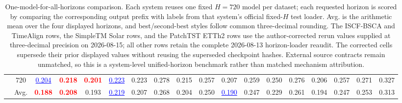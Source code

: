 \begin{table}[t]
{\begin{tabular}{cc|cc|cc|cc|cc|cc|cc|cc|cc}
 & 720 & \textcolor{blue}{\underline{0.204}} & \textcolor{red}{\textbf{0.218}} & \textcolor{red}{\textbf{0.201}} & \textcolor{blue}{\underline{0.223}} & 0.223 & 0.278 & 0.215 & 0.257 & 0.207 & 0.259 & 0.250 & 0.276 & 0.206 & 0.257 & 0.271 & 0.327 \\
\cmidrule(lr){2-18}
 & Avg. & \textcolor{red}{\textbf{0.188}} & \textcolor{red}{\textbf{0.208}} & 0.193 & \textcolor{blue}{\underline{0.219}} & 0.207 & 0.268 & 0.204 & 0.250 & \textcolor{blue}{\underline{0.190}} & 0.247 & 0.229 & 0.261 & 0.194 & 0.247 & 0.253 & 0.313 \\
\bottomrule
\end{tabular}%
}
\caption{One-model-for-all-horizons comparison. Each system reuses one fixed $H=720$ model per dataset; each requested horizon is scored by comparing the corresponding output prefix with labels from that system's official fixed-$H$ test loader. Avg. is the arithmetic mean over the four displayed horizons, and best/second-best styles follow common three-decimal rounding. The ISCF-BSCA and TimeAlign rows, the SimpleTM Solar rows, and the PatchTST ETTh2 rows use the author-corrected rerun values supplied at three-decimal precision on 2026-08-15; all other rows retain the complete 2026-08-13 horizon-loader reaudit. The corrected cells supersede their prior displayed values without reusing the superseded checkpoint hashes. External source contracts remain unmatched, so this is a system-level unified-horizon benchmark rather than matched mechanism attribution.}
\label{tab:main_ii_h720_horizon_loader}
\end{table}
